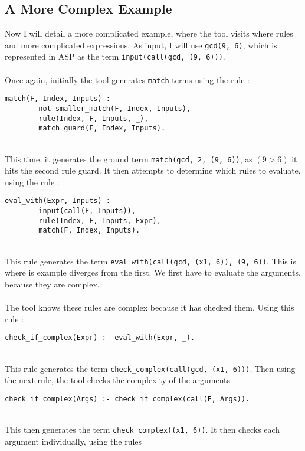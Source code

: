 \subsection{A More Complex Example}
Now I will detail a more complicated example, where the tool visits where rules and more complicated expressions. As input, I will use \lstinline{gcd(9, 6)}, which is represented in ASP as the term \lstinline{input(call(gcd, (9, 6)))}. \\ \\
Once again, initially the tool generates \lstinline{match} terms using the rule : \\ %

\begin{lstlisting}[firstnumber=197]
match(F, Index, Inputs) :-
		not smaller_match(F, Index, Inputs), 
		rule(Index, F, Inputs, _), 
		match_guard(F, Index, Inputs).
\end{lstlisting}
\mbox{} \\
This time, it generates the ground term \lstinline{match(gcd, 2, (9, 6))}, as $(9 > 6)$ it hits the second rule guard. It then attempts to determine which rules to evaluate, using the rule : \\ %

\begin{lstlisting}[firstnumber=128]
eval_with(Expr, Inputs) :- 
		input(call(F, Inputs)), 
		rule(Index, F, Inputs, Expr), 
		match(F, Index, Inputs).
\end{lstlisting}
\mbox{} \\
This rule generates the term \lstinline!eval_with(call(gcd, (x1, 6)), (9, 6))!. This is where is example diverges from the first. We first have to evaluate the arguments, because they are complex. \\ \\
The tool knows these rules are complex because it has checked them. Using this rule : \\

\begin{lstlisting}[firstnumber=149]
check_if_complex(Expr) :- eval_with(Expr, _).
\end{lstlisting}
\mbox{} \\
This rule generates the term \lstinline!check_complex(call(gcd, (x1, 6)))!. Then using the next rule, the tool checks the complexity of the arguments \\

\begin{lstlisting}[firstnumber=151]
check_if_complex(Args) :- check_if_complex(call(F, Args)).
\end{lstlisting}
\mbox{} \\
This then generates the term \lstinline!check_complex((x1, 6))!. It then checks each argument individually, using the rules  \\

